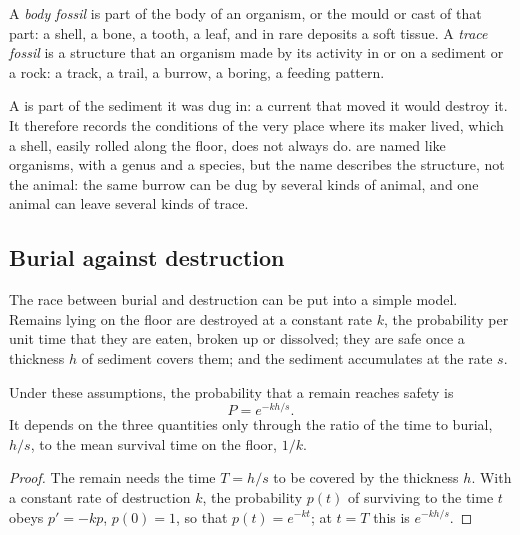 \begin{definition}\label{def:b2:palaeoenvironments:fossil-kinds}
A \emph{body fossil} is part of the body of an organism, or the mould or cast
of that part: a shell, a bone, a tooth, a leaf, and in rare deposits a soft tissue. A
\emph{trace fossil} is a structure that an organism made by its activity in or
on a sediment or a rock: a track, a trail, a burrow, a boring, a feeding pattern.
\end{definition}

A  is part of the sediment it was dug in: a current that moved it would destroy it.
It therefore records the conditions of the very place where its maker lived, which a shell,
easily rolled along the floor, does not always do.  are named like organisms, with a
genus and a species, but the name describes the structure, not the animal: the same burrow can be
dug by several kinds of animal, and one animal can leave several kinds of trace.

\subsection*{Burial against destruction}

The race between burial and destruction can be put into a simple model. Remains lying on the
floor are destroyed at a constant rate $k$, the probability per unit time that they are eaten,
broken up or dissolved; they are safe once a thickness $h$ of sediment covers them; and the
sediment accumulates at the rate $s$.

\begin{proposition}\label{prop:b2:palaeoenvironments:burial}
Under these assumptions, the probability that a remain reaches safety is
\[
  P = e^{-kh/s}.
\]
It depends on the three quantities only through the ratio of the time to burial, $h/s$, to the
mean survival time on the floor, $1/k$.
\end{proposition}

\begin{proof}
The remain needs the time $T = h/s$ to be covered by the thickness $h$. With a constant rate of
destruction $k$, the probability $p(t)$ of surviving to the time $t$ obeys $p' = -kp$, $p(0) =
1$, so that $p(t) = e^{-kt}$; at $t = T$ this is $e^{-kh/s}$.
\end{proof}


